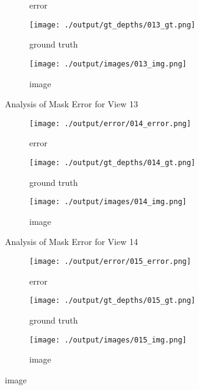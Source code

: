 \documentclass{article}
\begin{document}
\begin{figure}
\begin{subfigure}{0.3\textwidth}
		\caption{error}
		\label{fig:error13}
	\end{subfigure}
	\hfill
	\centering
	\begin{subfigure}{0.3\textwidth}
		\centering
		\texttt{[image: ./output/gt\_depths/013\_gt.png]}
		\caption{ground truth}
		\label{fig:gt13}
	\end{subfigure}
	\hfill
	\centering
	\begin{subfigure}{0.3\textwidth}
		\centering
		\texttt{[image: ./output/images/013\_img.png]}
		\caption{image}
		\label{fig:img13}
	\end{subfigure}
	\hfill
	\caption{Analysis of Mask Error for View 13}
	\label{fig:error_analys13}
\end{figure}\begin{figure}
	\centering
	\begin{subfigure}{0.3\textwidth}
		\centering
		\texttt{[image: ./output/error/014\_error.png]}
		\caption{error}
		\label{fig:error14}
	\end{subfigure}
	\hfill
	\centering
	\begin{subfigure}{0.3\textwidth}
		\centering
		\texttt{[image: ./output/gt\_depths/014\_gt.png]}
		\caption{ground truth}
		\label{fig:gt14}
	\end{subfigure}
	\hfill
	\centering
	\begin{subfigure}{0.3\textwidth}
		\centering
		\texttt{[image: ./output/images/014\_img.png]}
		\caption{image}
		\label{fig:img14}
	\end{subfigure}
	\hfill
	\caption{Analysis of Mask Error for View 14}
	\label{fig:error_analys14}
\end{figure}\begin{figure}
	\centering
	\begin{subfigure}{0.3\textwidth}
		\centering
		\texttt{[image: ./output/error/015\_error.png]}
		\caption{error}
		\label{fig:error15}
	\end{subfigure}
	\hfill
	\centering
	\begin{subfigure}{0.3\textwidth}
		\centering
		\texttt{[image: ./output/gt\_depths/015\_gt.png]}
		\caption{ground truth}
		\label{fig:gt15}
	\end{subfigure}
	\hfill
	\centering
	\begin{subfigure}{0.3\textwidth}
		\centering
		\texttt{[image: ./output/images/015\_img.png]}
		\caption{image}
		\label{fig:img15}
	\end{subfigure}

\end{figure}
\end{document}
